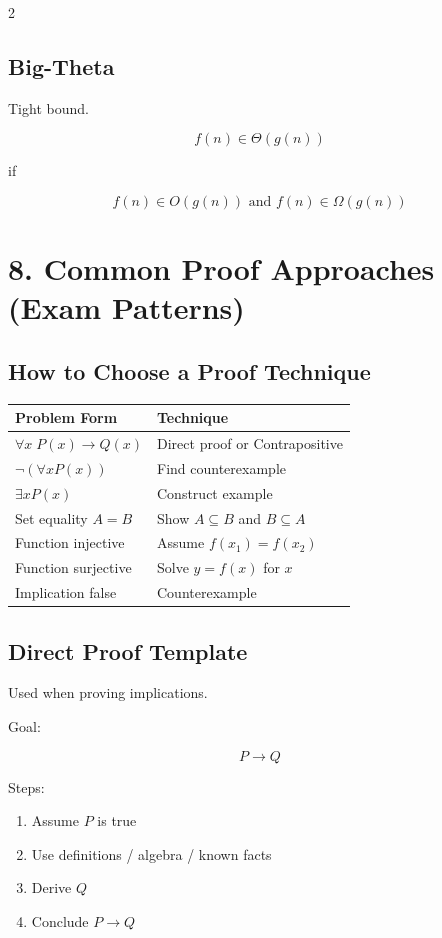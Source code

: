 \documentclass[10pt]{article}
\begin{document}
\begin{multicols}{2}
\subsection*{Big-Theta}

Tight bound.

\[
f(n) \in \Theta(g(n))
\]

if

\[
f(n) \in O(g(n)) \text{ and } f(n) \in \Omega(g(n))
\]

\section*{8. Common Proof Approaches (Exam Patterns)}

\subsection*{How to Choose a Proof Technique}

\begin{tabular}{l|l}
Problem Form & Technique \\
\hline
$\forall x \; P(x) \rightarrow Q(x)$ & Direct proof or Contrapositive \\
$\neg(\forall x P(x))$ & Find counterexample \\
$\exists x P(x)$ & Construct example \\
Set equality $A=B$ & Show $A\subseteq B$ and $B\subseteq A$ \\
Function injective & Assume $f(x_1)=f(x_2)$ \\
Function surjective & Solve $y=f(x)$ for $x$ \\
Implication false & Counterexample
\end{tabular}

\subsection*{Direct Proof Template}

Used when proving implications.

Goal:

\[
P \rightarrow Q
\]

Steps:

\begin{enumerate}
\item Assume $P$ is true
\item Use definitions / algebra / known facts
\item Derive $Q$
\item Conclude $P \rightarrow Q$
\end{enumerate}


\end{multicols}
\end{document}
